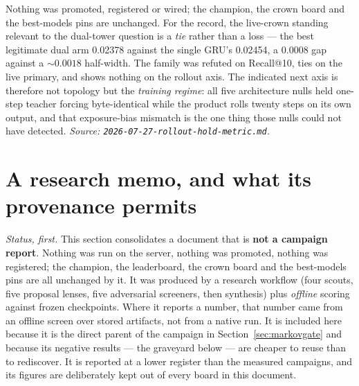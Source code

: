 \documentclass[11pt]{article}
\begin{document}
Nothing was promoted, registered or wired; the champion, the crown board and the
best-models pins are unchanged. For the record, the live-crown standing relevant
to the dual-tower question is a \emph{tie} rather than a loss --- the best
legitimate dual arm \num{0.02378} against the single GRU's \num{0.02454}, a
\num{0.0008} gap against a ${\sim}\num{0.0018}$ half-width. The family was refuted
on Recall@10, ties on the live primary, and shows nothing on the rollout axis.
The indicated next axis is therefore not topology but the \emph{training regime}:
all five architecture nulls held one-step teacher forcing byte-identical while the
product rolls twenty steps on its own output, and that exposure-bias mismatch is
the one thing those nulls could not have detected.
\emph{Source: \texttt{2026-07-27-rollout-hold-metric.md}.}

\section{A research memo, and what its provenance permits}
\label{sec:memo}
\emph{Status, first.} This section consolidates a document that is \textbf{not a
campaign report}. Nothing was run on the server, nothing was promoted, nothing was
registered; the champion, the leaderboard, the crown board and the best-models
pins are all unchanged by it. It was produced by a research workflow (four scouts,
five proposal lenses, five adversarial screeners, then synthesis) plus
\emph{offline} scoring against frozen checkpoints. Where it reports a number, that
number came from an offline screen over stored artifacts, not from a native run.
It is included here because it is the direct parent of the campaign in
Section~\ref{sec:markovgate} and because its negative results --- the graveyard
below --- are cheaper to reuse than to rediscover. It is reported at a lower
register than the measured campaigns, and its figures are deliberately kept out of
every board in this document.
\end{document}
